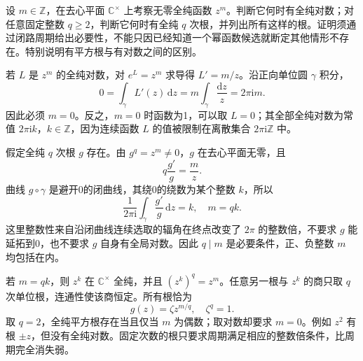 \begin{exercise}\label{b3:ex:05-7}
设 \(m\in\mathbb Z\)，在去心平面 \(\mathbb C^\times\) 上考察无零全纯函数 \(z^m\)。判断它何时有全纯对数；对任意固定整数 \(q\ge2\)，判断它何时有全纯 \(q\) 次根，并列出所有这样的根。证明须通过闭路周期给出必要性，不能只因已经知道一个幂函数候选就断定其他情形不存在。特别说明有平方根与有对数之间的区别。
\end{exercise}
\begin{solution}
若 \(L\) 是 \(z^m\) 的全纯对数，对 \(e^L=z^m\) 求导得 \(L'=m/z\)。沿正向单位圆 \(\gamma\) 积分，
\[
 0=\int_\gamma L'(z)\,\mathrm{d}z
  =m\int_\gamma\frac{\mathrm{d}z}{z}
  =2\pi\mathrm{i}m.
\]
因此必须 \(m=0\)。反之，\(m=0\) 时函数为1，可以取 \(L=0\)；其全部全纯对数为常值 \(2\pi\mathrm{i}k\)，\(k\in\mathbb Z\)，因为连续函数 \(L\) 的值被限制在离散集合 \(2\pi\mathrm{i}\mathbb Z\) 中。

假定全纯 \(q\) 次根 \(g\) 存在。由 \(g^q=z^m\ne0\)，\(g\) 在去心平面无零，且
\[
 q\frac{g'}g=\frac mz.
\]
曲线 \(g\circ\gamma\) 是避开0的闭曲线，其绕0的绕数为某个整数 \(k\)，所以
\[
 \frac1{2\pi\mathrm{i}}\int_\gamma\frac{g'}g\,\mathrm{d}z=k,
 \quad m=qk.
\]
这里整数性来自沿闭曲线连续选取的辐角在终点改变了 \(2\pi\) 的整数倍，不要求 \(g\) 能延拓到0，也不要求 \(g\) 自身有全局对数。因此 \(q\mid m\) 是必要条件，正、负整数 \(m\) 均包括在内。

若 \(m=qk\)，则 \(z^k\) 在 \(\mathbb C^\times\) 全纯，并且 \((z^k)^q=z^m\)。任意另一根与 \(z^k\) 的商只取 \(q\) 次单位根，连通性使该商恒定。所有根恰为
\[
 g(z)=\zeta z^{m/q},\quad \zeta^q=1.
\]
取 \(q=2\)，全纯平方根存在当且仅当 \(m\) 为偶数；取对数却要求 \(m=0\)。例如 \(z^2\) 有根 \(\pm z\)，但没有全纯对数。固定次数的根只要求周期满足相应的整数倍条件，比周期完全消失弱。
\end{solution}

